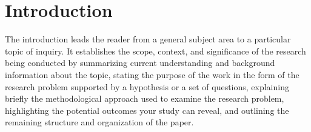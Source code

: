 \documentclass[reprint,amsmath,amssymb,aps]{revtex4-1}
\begin{document}
\maketitle

\section{Introduction}

The introduction leads the reader from a general subject area to a particular topic of inquiry. It establishes the scope, context, and significance of the research being conducted by summarizing current understanding and background information about the topic, stating the purpose of the work in the form of the research problem supported by a hypothesis or a set of questions, explaining briefly the methodological approach used to examine the research problem, highlighting the potential outcomes your study can reveal, and outlining the remaining structure and organization of the paper.

\end{document}
